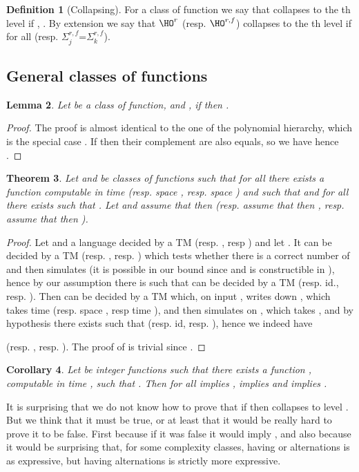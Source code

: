 \documentclass[a4paper,12pt]{article}
\newtheorem{theorem}{Theorem}[section]
\newtheorem{lemma}[theorem]{Lemma}
\newtheorem{corollary}[theorem]{Corollary}
\theoremstyle{definition}
\newtheorem{definition}[theorem]{Definition}
\newcommand{\hoa}[1]{\ensuremath{\HO^{#1}}}
\newcommand{\hod}[2]{\ensuremath{\HO^{#1,#2}}}
\newcommand{\hoc}[3]{\ensuremath{\Sigma^{#1,#3}_{#2}}}
\begin{document}
\begin{definition}[Collapsing]
  For a class of function  we say that  collapses to the th
  level if , .  By extension we
  say that \hoa r (resp. \hod rf) collapses to the th level if for
  all   (resp.  
  \hoc{r}{j}{f}=\hoc{r}{k}{f}).
\end{definition}
\subsection{General classes of functions}
\begin{lemma}\label{lem:alt}
  Let  be a class of function, and , if
   then
  .
\end{lemma}
\begin{proof}
  The proof is almost identical to the one of the polynomial
  hierarchy, which is the special case . If
   then their complement are also equals,
  so we have  hence
  .
\end{proof}
\begin{theorem}\label{atimehigher}
  Let  and  be classes of functions such that for all 
  there exists a function  computable in time (resp. space
  , resp. space ) and  such that
   and for all  there exists
   such that . Let  and
  assume that  then
   (resp. assume that
   then , resp. assume
  that  then
  ).
\end{theorem}
\begin{proof}
  Let  and  a language decided by a TM
  (resp. , resp ) and let
  . It can be decided by a TM (resp. , resp. )
  which tests whether there is a correct number of  and then
  simulates  (it is possible in our bound since  and  is constructible  in
  ), hence by our assumption there is  such that
   can be decided by a TM  (resp. id.,
  resp. ). Then  can be decided by a TM 
  which, on input , writes down , which takes time
   (resp. space , resp time ), and then
  simulates  on , which takes , and by
  hypothesis there exists  such that
  (resp. id, resp. ), hence we indeed have
  
  (resp. ,
  resp. ). The proof of  is
  trivial since .
\end{proof}
\begin{corollary}
  Let  be integer functions such that there exists a function ,
  computable in time , such that . Then for
  all   implies
  ,  implies
   and  implies
  .
\end{corollary}
It is surprising that we do not know how to prove that if
 then  collapses to level . But we
think that it must be true, or at least that it would be really hard
to prove it to be false. First because if it was false it would imply
, and also because it would be surprising that, for
some complexity classes, having  or  alternations is as
expressive, but having  alternations is strictly more expressive.
\end{document}
